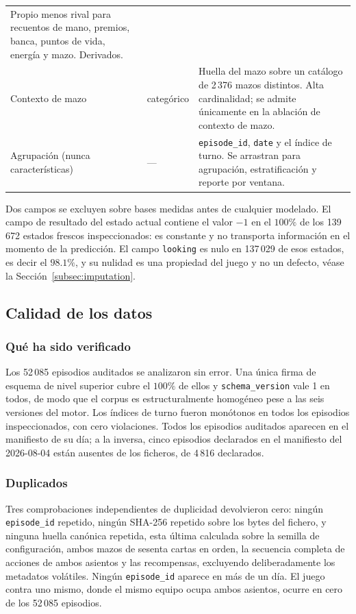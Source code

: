 \documentclass[conference]{IEEEtran}
\newcommand{\code}[1]{\texttt{#1}}
\begin{document}
\begin{table}[!t]
\begin{tabularx}{\columnwidth}{@{}P{1.5cm} P{1.35cm} Y@{}}
Propio menos rival para recuentos de mano, premios, banca, puntos de vida,
energ\'ia y mazo. Derivados.\\
Contexto de mazo & categ\'orico &
Huella del mazo sobre un cat\'alogo de 2\,376 mazos distintos. Alta
cardinalidad; se admite \'unicamente en la ablaci\'on de contexto de mazo.\\
\midrule
Agrupaci\'on \newline (nunca caracter\'isticas) & --- &
\code{episode\_id}, \code{date} y el \'indice de turno. Se arrastran para
agrupaci\'on, estratificaci\'on y reporte por ventana.\\
\bottomrule
\end{tabularx}
\end{table}

Dos campos se excluyen sobre bases medidas antes de cualquier modelado. El
campo de resultado del estado actual contiene el valor $-1$ en el
$100\%$ de los 139\,672 estados frescos inspeccionados: es constante y no
transporta informaci\'on en el momento de la predicci\'on. El campo
\code{looking} es nulo en 137\,029 de esos estados, es decir el
$98.1\%$, y su nulidad es una propiedad del juego y no un defecto,
v\'ease la Secci\'on~\ref{subsec:imputation}.

\subsection{Calidad de los datos}
\label{subsec:quality}

\subsubsection{Qu\'e ha sido verificado}
Los 52\,085 episodios auditados se analizaron sin error. Una \'unica firma
de esquema de nivel superior cubre el $100\%$ de ellos y
\code{schema\_version} vale 1 en todos, de modo que el corpus es
estructuralmente homog\'eneo pese a las seis versiones del motor. Los
\'indices de turno fueron mon\'otonos en todos los episodios inspeccionados,
con cero violaciones. Todos los episodios auditados aparecen en el manifiesto
de su d\'ia; a la inversa, cinco episodios declarados en el manifiesto del
2026-08-04 est\'an ausentes de los ficheros, de 4\,816 declarados.

\subsubsection{Duplicados}
Tres comprobaciones independientes de duplicidad devolvieron cero: ning\'un
\code{episode\_id} repetido, ning\'un SHA-256 repetido sobre los bytes del
fichero, y ninguna huella can\'onica repetida, esta \'ultima calculada sobre
la semilla de configuraci\'on, ambos mazos de sesenta cartas en orden, la
secuencia completa de acciones de ambos asientos y las recompensas,
excluyendo deliberadamente los metadatos vol\'atiles. Ning\'un
\code{episode\_id} aparece en m\'as de un d\'ia. El juego contra uno mismo,
donde el mismo equipo ocupa ambos asientos, ocurre en cero de los 52\,085
episodios.
\end{document}
